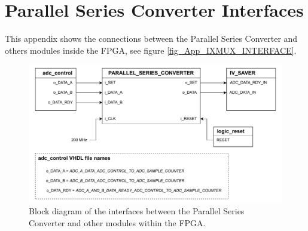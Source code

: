 \chapter{Parallel Series Converter Interfaces} \label{App:PSC_INTERFACE}
This appendix shows the connections between the Parallel Series Converter and others modules inside the FPGA, see figure \ref{fig_App_IXMUX_INTERFACE}.

\begin{figure}[H]
    \centering
    \includegraphics[clip, trim=0 0 0 0,width=1.0\textwidth]{Appendix/Figures/PSC_INTERFACE.pdf}
    \caption{Block diagram of the interfaces between the Parallel Series Converter and other modules within the FPGA.}
    \label{fig_App_PSC_INTERFACE}
\end{figure}
